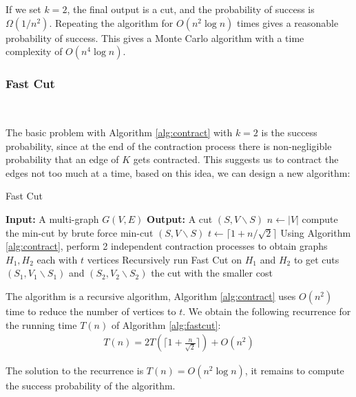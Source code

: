 \documentclass[11pt]{article}
\theoremstyle{plain}
\begin{document}
If we set $k=2$, the final output is a cut, and the probability of success is $\Omega(1/n^2)$. Repeating the algorithm for $O(n^2\log n)$ times gives a reasonable probability of success. This gives a Monte Carlo algorithm with a time complexity of $O(n^4\log n)$.

\subsubsection{Fast Cut}\

The basic problem with Algorithm \ref{alg:contract} with $k=2$ is the success probability, since at the end of the contraction process there is non-negligible probability that an edge of $K$ gets contracted. This suggests us to contract the edges not too much at a time, based on this idea, we can design a new algorithm:

\begin{algorithm}
\caption{Fast Cut}
\label{alg:fastcut}
\begin{algorithmic}[1]
    \STATE \textbf{Input:} A multi-graph $G(V,E)$
    \STATE \textbf{Output:} A cut $(S,V\backslash S)$
    \STATE $n\leftarrow |V|$
    \STATE compute the min-cut by brute force
    \RETURN min-cut $(S,V\backslash S)$
    \ELSE
    \STATE $t\leftarrow \lceil 1+n/\sqrt{2}\rceil$
    \STATE Using Algorithm \ref{alg:contract}, perform 2 independent contraction processes to obtain graphs $H_1,H_2$ each with $t$ vertices
    \STATE Recursively run Fast Cut on $H_1$ and $H_2$ to get cuts $(S_1,V_1\backslash S_1)$ and $(S_2,V_2\backslash S_2)$
    \RETURN the cut with the smaller cost
    \ENDIF
\end{algorithmic}
\end{algorithm}

The algorithm is a recursive algorithm, Algorithm \ref{alg:contract} uses $O(n^2)$ time to reduce the number of vertices to $t$. We obtain the following recurrence for the running time $T(n)$ of Algorithm \ref{alg:fastcut}:
\begin{align*}
    T(n)=2T\left(\lceil 1+\frac{n}{\sqrt{2}}\rceil\right)+O(n^2)
\end{align*}

The solution to the recurrence is $T(n)=O(n^2\log n)$, it remains to compute the success probability of the algorithm. 
\end{document}
